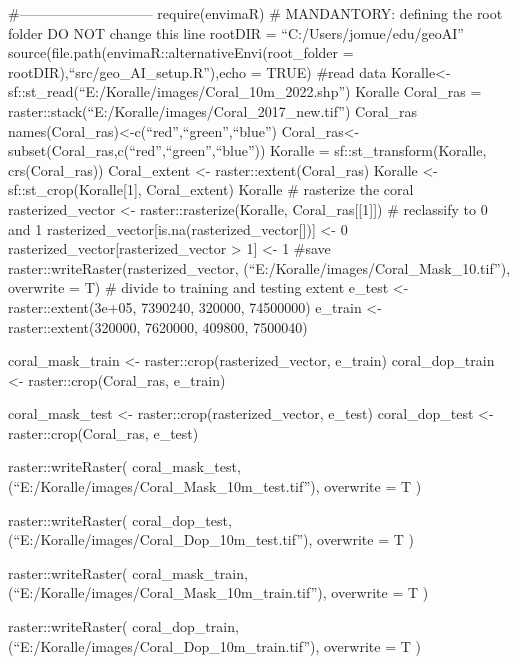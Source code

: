 \documentclass[
]{article}
\author{}
\date{\vspace{-2.5em}}
\begin{document}
\#----------------------------- require(envimaR) \# MANDANTORY: defining
the root folder DO NOT change this line rootDIR =
``C:/Users/jomue/edu/geoAI''
source(file.path(envimaR::alternativeEnvi(root\_folder =
rootDIR),``src/geo\_AI\_setup.R''),echo = TRUE) \#read data
Koralle\textless-sf::st\_read(``E:/Koralle/images/Coral\_10m\_2022.shp'')
Koralle Coral\_ras =
raster::stack(``E:/Koralle/images/Coral\_2017\_new.tif'') Coral\_ras
names(Coral\_ras)\textless-c(``red'',``green'',``blue'')
Coral\_ras\textless-subset(Coral\_ras,c(``red'',``green'',``blue''))
Koralle = sf::st\_transform(Koralle, crs(Coral\_ras)) Coral\_extent
\textless- raster::extent(Coral\_ras) Koralle \textless-
sf::st\_crop(Koralle{[}1{]}, Coral\_extent) Koralle \# rasterize the
coral rasterized\_vector \textless- raster::rasterize(Koralle,
Coral\_ras{[}{[}1{]}{]}) \# reclassify to 0 and 1
rasterized\_vector{[}is.na(rasterized\_vector{[}{]}){]} \textless- 0
rasterized\_vector{[}rasterized\_vector \textgreater{} 1{]} \textless- 1
\#save raster::writeRaster(rasterized\_vector,
(``E:/Koralle/images/Coral\_Mask\_10.tif''), overwrite = T) \# divide to
training and testing extent e\_test \textless- raster::extent(3e+05,
7390240, 320000, 74500000) e\_train \textless- raster::extent(320000,
7620000, 409800, 7500040)

coral\_mask\_train \textless- raster::crop(rasterized\_vector, e\_train)
coral\_dop\_train \textless- raster::crop(Coral\_ras, e\_train)

coral\_mask\_test \textless- raster::crop(rasterized\_vector, e\_test)
coral\_dop\_test \textless- raster::crop(Coral\_ras, e\_test)

raster::writeRaster( coral\_mask\_test,
(``E:/Koralle/images/Coral\_Mask\_10m\_test.tif''), overwrite = T )

raster::writeRaster( coral\_dop\_test,
(``E:/Koralle/images/Coral\_Dop\_10m\_test.tif''), overwrite = T )

raster::writeRaster( coral\_mask\_train,
(``E:/Koralle/images/Coral\_Mask\_10m\_train.tif''), overwrite = T )

raster::writeRaster( coral\_dop\_train,
(``E:/Koralle/images/Coral\_Dop\_10m\_train.tif''), overwrite = T )
\end{document}
